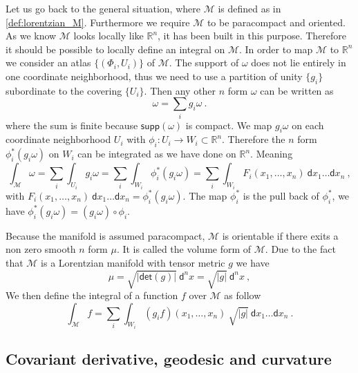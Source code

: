 \documentclass[10pt]{book}
\newcommand{\supp}{\mathsf{supp}}
\newcommand{\abs}[1]{\left|#1\right|}
\renewcommand{\det}{\mathsf{det}}
\let\int\int
\newcommand{\Mcal}{\mathcal{M}}
\newcommand{\Rbb}{\mathbb{R}}
\newcommand{\dsf}{\mathsf{d}}
\theoremstyle{break}
\begin{document}
\bigskip


Let us go back to the general situation, where $\Mcal$ is defined as in \ref{def:lorentzian_M}. Furthermore we require $\Mcal$ to be paracompact and oriented. As we know $\Mcal$ looks locally like $\Rbb^n$, it has been built in this purpose. Therefore it should be possible to locally define an integral on $\Mcal$. In order to map $\Mcal$ to $\Rbb^n$ we consider an atlas $\{(\Phi_i,U_i)\}$ of $\Mcal$. The support of $\omega$ does not lie entirely in one coordinate neighborhood, thus we need to use a partition of unity $\{g_i\}$ subordinate to the covering $\{U_i\}$. Then any other $n$ form $\omega$ can be written as
%
\begin{equation*}
\omega = \sum_{i} g_i \omega \ .
\end{equation*}
%
where the sum is finite because $\supp(\omega)$ is compact. We map $g_i \omega$ on each coordinate neighborhood $U_i$ with $\phi_i : U_i \to W_i \subset \Rbb^n$. Therefore the $n$ form $\phi_i ^\ast (g_i\omega)$ on $W_i$ can be integrated as we have done on $\Rbb^n$. Meaning
%
\begin{equation*}
\int_\Mcal \omega = \sum_i \int_{U_i} g_i \omega = \sum_i \int_{W_i} \phi_i ^\ast (g_i\omega) = \sum_i \int_{W_i} F_i(x_1,\dots,x_n) \ \dsf x_1 \dots \dsf x_n \ ,
\end{equation*} 
%
with $F_i(x_1,\dots,x_n) \ \dsf x_1 \dots \dsf x_n = \phi_i ^\ast (g_i\omega)$. The map $\phi_i ^\ast$ is the pull back of $\phi_i ^\ast$, we have $\phi_i ^\ast(g_i\omega) = (g_i\omega) \circ \phi_i$.



\bigskip


Because the manifold is assumed paracompact, $\Mcal$ is orientable if there exits a non zero smooth $n$ form $\mu$. It is called the volume form of $\Mcal$. Due to the fact that $\Mcal$ is a Lorentzian manifold with tensor metric $g$ we have 
%
\begin{equation*}
\mu = \sqrt{\abs{\det\left(g\right)}} \ \dsf^n x = \sqrt{\abs{g}} \ \dsf^n x \ ,
\end{equation*}
%
We then define the integral of a function $f$ over $\Mcal$ as follow
%
\begin{equation*}
\int_\Mcal f = \sum_i \int_{W_i} (g_i f)(x_1,\dots,x_n) \ \sqrt{\abs{g}} \ \dsf x_1 \dots \dsf x_n \ .
\label{eq:int_manifold}
\end{equation*}


\subsection{Covariant derivative, geodesic and curvature}
\end{document}
